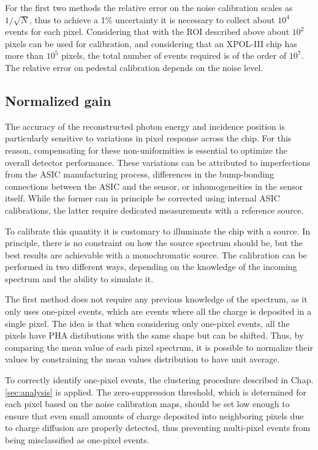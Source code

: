 For the first two methods the relative error on the noise calibration scales as $1/\sqrt{N}$, thus to achieve a 1\% uncertainty it is necessary to collect about $10^4$ events for each pixel. Considering that with the ROI described above about $10^2$ pixels can be used for calibration, and considering that an XPOL-III chip has more than $10^5$ pixels, the total number of events required is of the order of $10^7$. The relative error on pedestal calibration depends on the noise level.


\subsection{Normalized gain}

The accuracy of the reconstructed photon energy and incidence position is particularly sensitive to variations in pixel response across the chip. For this reason, compensating for these non-uniformities is essential to optimize the overall detector performance. These variations can be attributed to imperfections from the ASIC manufacturing process, differences in the bump-bonding connections between the ASIC and the sensor, or inhomogeneities in the sensor itself. While the former can in principle be corrected using internal ASIC calibrations, the latter require dedicated measurements with a reference source.

To calibrate this quantity it is customary to illuminate the chip with a source. In principle, there is no constraint on how the source spectrum should be, but the best results are achievable with a monochromatic source. The calibration can be performed in two different ways, depending on the knowledge of the incoming spectrum and the ability to simulate it.

The first method does not require any previous knowledge of the spectrum, as it only uses one-pixel events, which are events where all the charge is deposited in a single pixel. The idea is that when considering only one-pixel events, all the pixels have PHA distibutions with the same shape but can be shifted. Thus, by comparing the mean value of each pixel spectrum, it is possible to normalize their values by constraining the mean values distribution to have unit average.

To correctly identify one-pixel events, the clustering procedure described in Chap. \ref{sec:analysis} is applied. The zero-suppression threshold, which is determined for each pixel based on the noise calibration maps, should be set low enough to ensure that even small amounts of charge deposited into neighboring pixels due to charge diffusion are properly detected, thus preventing multi-pixel events from being misclassified as one-pixel events.

